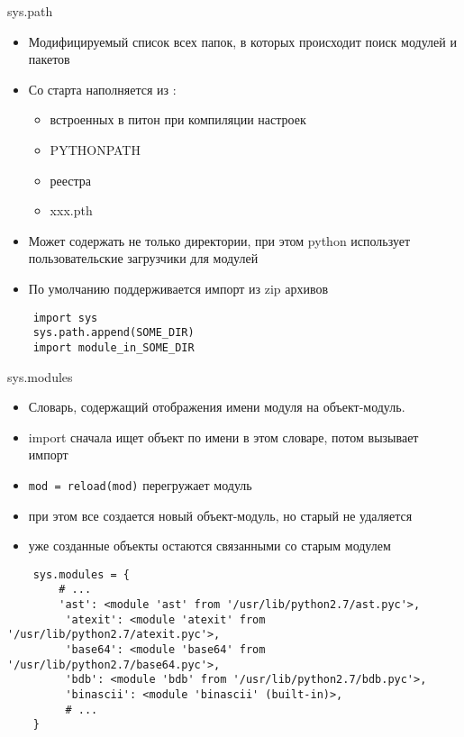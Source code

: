\documentclass{article}
\begin{document}
\begin{center} sys.path \end{center}
\begin{itemize}
    \item Модифицируемый список всех папок, в которых происходит поиск модулей и пакетов
    \item Со старта наполняется из :
    \begin{itemize}
    	\item встроенных в питон при компиляции настроек
    	\item PYTHONPATH
        \item реестра
        \item xxx.pth
    \end{itemize}
    \item Может содержать не только директории, при этом python использует
          пользовательские загрузчики для модулей
    \item По умолчанию поддерживается импорт из zip архивов
\end{itemize}

\begin{lstlisting}
    import sys
    sys.path.append(SOME_DIR)
    import module_in_SOME_DIR
\end{lstlisting}
\newpage

\begin{center} sys.modules \end{center}
\begin{itemize}
    \item Словарь, содержащий отображения имени модуля на объект-модуль.
    \item import сначала ищет объект по имени в этом словаре, потом вызывает импорт
    \item \lstinline!mod = reload(mod)! перегружает модуль
    \item при этом все создается новый объект-модуль, но старый не удаляется
    \item уже созданные объекты остаются связанными со старым модулем
\end{itemize}
\begin{lstlisting}
    sys.modules = {
        # ...
        'ast': <module 'ast' from '/usr/lib/python2.7/ast.pyc'>,
         'atexit': <module 'atexit' from '/usr/lib/python2.7/atexit.pyc'>,
         'base64': <module 'base64' from '/usr/lib/python2.7/base64.pyc'>,
         'bdb': <module 'bdb' from '/usr/lib/python2.7/bdb.pyc'>,
         'binascii': <module 'binascii' (built-in)>,
         # ...
    }
\end{lstlisting}
\newpage  
    
\end{document}
